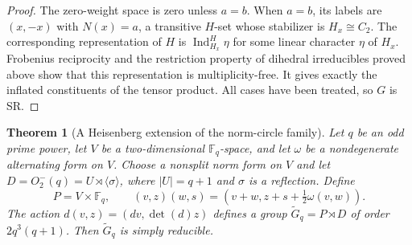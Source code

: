 \documentclass[11pt,a4paper]{amsart}
\newtheorem{thm}{Theorem}[section]
\theoremstyle{definition}
\theoremstyle{remark}
\numberwithin{equation}{section}
\begin{document}
\begin{proof}
The zero-weight space is zero unless $a=b$. When $a=b$, its labels are
$(x,-x)$ with $N(x)=a$, a transitive $H$-set whose stabilizer is
$H_x\cong C_2$. The corresponding representation of $H$ is
$\operatorname{Ind}_{H_x}^{H}\eta$ for some linear character $\eta$
of $H_x$. Frobenius reciprocity and the restriction property of
dihedral irreducibles proved above show that this representation is
multiplicity-free. It gives exactly the inflated constituents of
the tensor product. All cases have been treated, so $G$ is SR.
\end{proof}

\begin{thm}[A Heisenberg extension of the norm-circle family]
\label{thm:arithmetic-heisenberg-circle}
Let $q$ be an odd prime power, let $V$ be a two-dimensional
$\mathbb F_q$-space, and let $\omega$ be a nondegenerate alternating
form on $V$. Choose a nonsplit norm form on $V$ and let
$D=O^-_2(q)=U\rtimes\langle\sigma\rangle$, where $|U|=q+1$ and
$\sigma$ is a reflection. Define
\[
 P=V\times\mathbb F_q,\qquad
 (v,z)(w,s)=(v+w,z+s+\tfrac12\omega(v,w)).
\]
The action $d(v,z)=(dv,\det(d)z)$ defines a group
$\widetilde G_q=P\rtimes D$ of order $2q^3(q+1)$.
Then $\widetilde G_q$ is simply reducible.
\end{thm}
\end{document}

